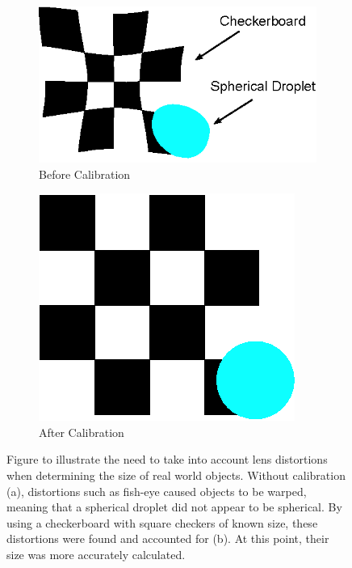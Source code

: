 \documentclass{physics_article_B}
\begin{document}
                \begin{figure}[H]
                    \centering
                  \begin{subfigure}[b]{0.48\textwidth}
                        \hspace*{1.5cm} \includegraphics[width=\textwidth]{Figures/Distorted.eps}
                        \caption{Before Calibration}
                        \label{fig:calibsetup:distorted}
                    \end{subfigure}
                    \begin{subfigure}[b]{0.48\textwidth}
                        \hspace{1.8cm}\includegraphics[scale=1.27]{Figures/Undistorted.eps}
                        \caption{After Calibration}
                        \label{fig:calibsetup:undistorted}
                    \end{subfigure}
                    \caption{Figure to illustrate the need to take into account lens distortions when determining the size of real world objects. Without calibration (a), distortions such as fish-eye caused objects to be warped, meaning that a spherical droplet did not appear to be spherical. By using a checkerboard with square checkers of known size, these distortions were found and accounted for (b). At this point, their size was more accurately calculated. }\label{fig:calibsetup}
                \end{figure}
                
\end{document}
